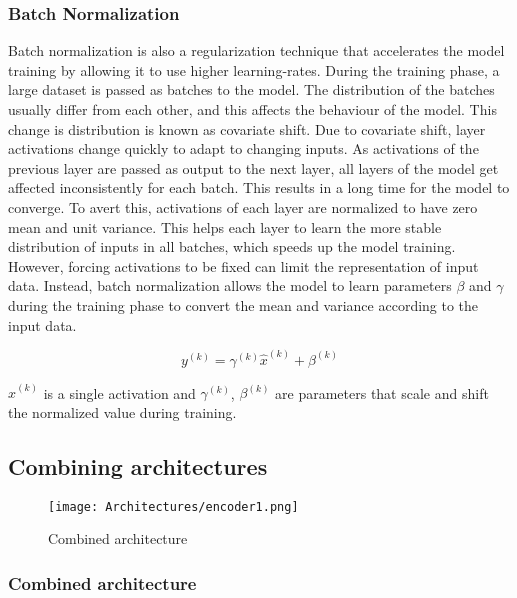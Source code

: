 \subsubsection{Batch Normalization}

Batch normalization \cite{ioffe2015batch} is also a regularization technique that accelerates the model training by allowing it to use higher learning-rates. During the training phase, a large dataset is passed as batches to the model. The distribution of the batches usually differ from each other, and this affects the behaviour of the model. This change is distribution is known as covariate shift. Due to covariate shift, layer activations change quickly to adapt to changing inputs. As activations of the previous layer are passed as output to the next layer, all layers of the model get affected inconsistently for each batch. This results in a long time for the model to converge. To avert this, activations of each layer are normalized to have zero mean and unit variance. This helps each layer to learn the more stable distribution of inputs in all batches, which speeds up the model training. However, forcing activations to be fixed can limit the representation of input data. Instead, batch normalization allows the model to learn parameters $\beta$ and $\gamma$ during the training phase to convert the mean and variance according to the input data. 

\begin{equation}
    y^(k) = \gamma^{(k)} \hat x^{(k)} + \beta^{(k)}
\end{equation}

$\hat x^{(k)}$ is a single activation and $\gamma^{(k)}$, $\beta^{(k)}$ are parameters that scale and shift the normalized value during training. 

\clearpage


\subsection{Combining architectures} \label{Combination}
\vfill
\begin{figure}[H]
   \centering
    \texttt{[image: Architectures/encoder1.png]}
    \caption{Combined architecture}
    \label{combination}
\end{figure} 
\vfill
\clearpage

\subsubsection{Combined architecture} \label{combinearchi}

